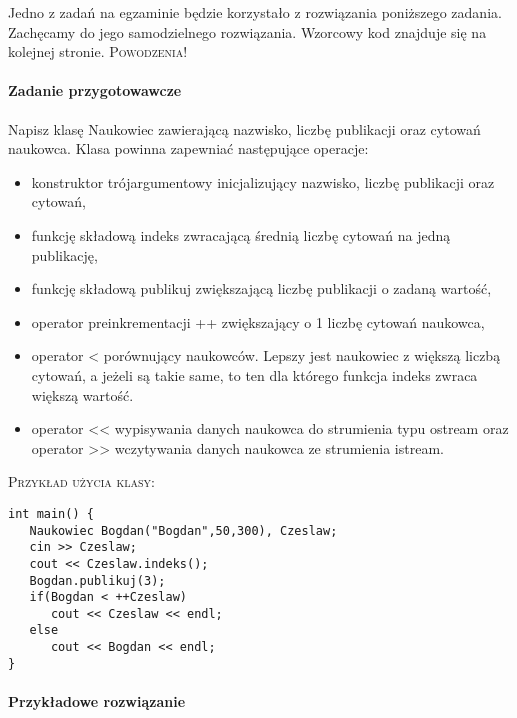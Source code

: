 \documentclass[12pt]{article}
\newcounter{zadanie}
\newcommand{\zadanie}{\stepcounter{zadanie}\paragraph*{Zadanie przygotowawcze}}
\newcounter{rozw}
\newcommand{\rozw}{\stepcounter{rozw}\paragraph*{Przykładowe rozwiązanie}}
\begin{document}
\small Jedno z zadań na egzaminie będzie korzystało z rozwiązania poniższego zadania. Zachęcamy do jego samodzielnego rozwiązania. Wzorcowy kod znajduje się na kolejnej stronie. \textsc{Powodzenia!}

\zadanie
Napisz klasę \textsf{Naukowiec} zawierającą nazwisko, liczbę publikacji oraz cytowań naukowca. Klasa powinna zapewniać następujące operacje:
\begin{itemize}
\item konstruktor trójargumentowy inicjalizujący nazwisko, liczbę publikacji oraz cytowań,
\item funkcję składową \textsf{indeks} zwracającą średnią liczbę cytowań na jedną publikację,
\item funkcję składową \textsf{publikuj} zwiększającą liczbę publikacji o zadaną wartość,
\item operator preinkrementacji \textsf{++} zwiększający o 1 liczbę cytowań naukowca,
\item operator \textsf{<} porównujący naukowców. Lepszy jest naukowiec z większą liczbą cytowań, a jeżeli są takie same, to ten dla którego funkcja \textsf{indeks} zwraca większą wartość.
\item operator \textsf{<<} wypisywania danych naukowca do strumienia typu \textsf{ostream} oraz operator \textsf{>>} wczytywania danych naukowca ze strumienia \textsf{istream}.
\end{itemize}
\textsc{Przykład użycia klasy:}
\begin{verbatim}
int main() {
   Naukowiec Bogdan("Bogdan",50,300), Czeslaw;
   cin >> Czeslaw;
   cout << Czeslaw.indeks();
   Bogdan.publikuj(3);
   if(Bogdan < ++Czeslaw)
      cout << Czeslaw << endl;
   else
      cout << Bogdan << endl;
}
\end{verbatim}

\newpage

\rozw
\end{document}
